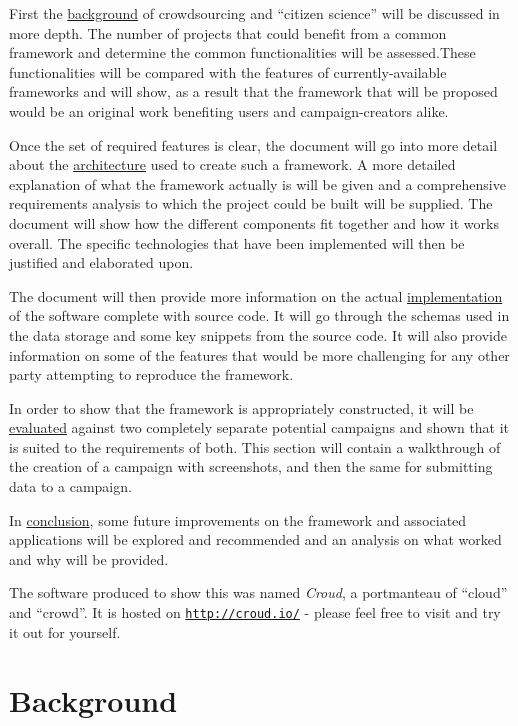 \documentclass{article}
\let\oldsection\section
\renewcommand\section{\clearpage\oldsection}
\begin{document}
		First the \hyperref[sec:background]{background} of crowdsourcing and ``citizen science'' will be discussed in more depth. The number of projects that could benefit from a common framework and determine the common functionalities will be assessed.These functionalities will be compared with the features of currently-available frameworks and will show, as a result that the framework that will be proposed would be an original work benefiting users and campaign-creators alike.

		Once the set of required features is clear, the document will go into more detail about the \hyperref[sec:architecture]{architecture} used to create such a framework. A more detailed explanation of what the framework actually is will be given and a comprehensive requirements analysis to which the project could be built will be supplied. The document will show how the different components fit together and how it works overall. The specific technologies that have been implemented will then be justified and elaborated upon.

		The document will then provide more information on the actual \hyperref[sec:implementation]{implementation} of the software complete with source code. It will go through the schemas used in the data storage and some key snippets from the source code. It will also provide information on some of the features that would be more challenging for any other party attempting to reproduce the framework.

		In order to show that the framework is appropriately constructed, it will be \hyperref[sec:evaluation]{evaluated} against two completely separate potential campaigns and shown that it is suited to the requirements of both. This section will contain a walkthrough of the creation of a campaign with screenshots, and then the same for submitting data to a campaign.

		In \hyperref[sec:conclusion]{conclusion}, some future improvements on the framework and associated applications will be explored and recommended and an analysis on what worked and why will be provided.

		The software produced to show this was named \emph{Croud}, a portmanteau of ``cloud'' and ``crowd''. It is hosted on \href{http://croud.io/}{\texttt{http://croud.io/}} - please feel free to visit and try it out for yourself.

	\section{Background}
	\label{sec:background}
\end{document}

